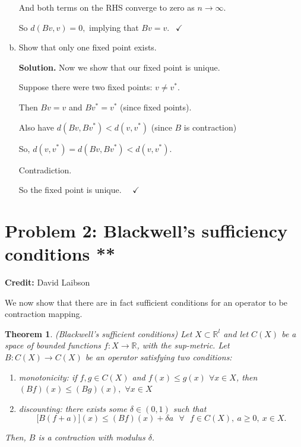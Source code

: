 \documentclass[11pt]{extarticle}
\theoremstyle{plain}
\newtheorem{thm}{Theorem}
\theoremstyle{definition}
\begin{document}
\begin{enumerate}[(a)]
And both terms on the RHS converge to zero as $n\rightarrow \infty .$

So $d(Bv,v)=0,$ implying that $Bv=v.$ $\ \ \checkmark $



\item Show that only one fixed point exists. 

\textbf{Solution.} Now we show that our fixed point is unique.

Suppose there were two fixed points: $v\neq v^{\ast }.$

Then $Bv=v$ and $Bv^{\ast }=v^{\ast }$ (since fixed points).

Also have $d(Bv,Bv^{\ast })<d(v,v^{\ast })$ (since $B$ is contraction)

So, $d(v,v^{\ast })=d(Bv,Bv^{\ast })<d(v,v^{\ast }).$

Contradiction.

So the fixed point is unique. \ \ $\checkmark $


\end{enumerate}




\vspace{10mm}
\section*{Problem 2: Blackwell's sufficiency conditions  **}

\textbf{Credit:} David Laibson


\vspace{5mm}
\noindent
We now show that there are in fact sufficient conditions for an operator to be contraction mapping.

\begin{thm}
	
	(Blackwell's sufficient conditions) Let $X \subset \mathbb R^l$ and let $C(X)$ be a space of bounded functions $f:X \to \mathbb R$, with the sup-metric. Let $B : C(X) \to C(X)$ be an operator satisfying two conditions:
	\begin{enumerate}[1.]
		\item monotonicity: if $f,g\in C(X)$ and $f(x)\leq g(x)$ $\forall x\in X$,%
		\newline
		then $(Bf)(x)\leq (Bg)(x),$ $\forall x\in X$\newline
		
		\item discounting: there exists some $\delta \in (0,1)$ such that 
		\[
		\lbrack B(f+a)](x)\leq (Bf)(x)+\delta a\text{ \ }\forall \text{ }f\in C(X),\
		a\geq 0,\ x\in X. 
		\]%
	\end{enumerate}
	
	\noindent
	Then, $B$ is a contraction with modulus $\delta$.
\end{thm}
\end{document}
